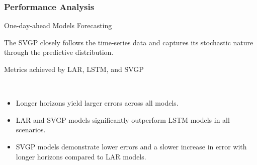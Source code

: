 \subsubsection{Performance Analysis}


\begin{frame}{One-day-ahead Models Forecasting}
	\centering
	\begin{figure}[htbp]
		\tiny
		\setlength{} 
		\setlength{}
		
		\subfloat[Reservoir $A$]{}
		\subfloat[Reservoir $I$]{}
	\end{figure}
	\vspace{-1.5em}
	\begin{block}{}
	 The SVGP closely follows the time-series data and captures its stochastic nature through the predictive distribution.
	\end{block}
\end{frame}

\begin{frame}{Metrics achieved by LAR, LSTM, and SVGP}
	\vspace{-0.6em}
	\begin{figure}[htbp]
			\centering
			\tiny
			\setlength{} 
			\setlength{}
			
			\hspace{18em} %
			 \\ %
			
			\subfloat[LAR]{}
			\subfloat[LSTM]{}
			\subfloat[SVGP]{}
		\end{figure}
		\vspace{-1.3em}
	\begin{itemize}
		\item Longer horizons yield larger errors across all models.
		\item LAR and SVGP models significantly outperform LSTM models in all scenarios.
		\item SVGP models demonstrate lower errors and a slower increase in error with longer horizons compared to LAR models.
	\end{itemize}
\end{frame}


